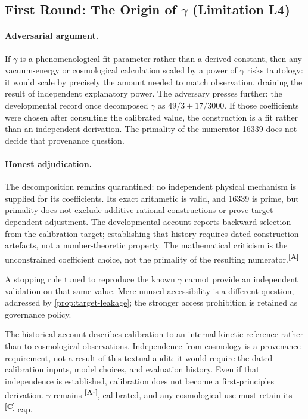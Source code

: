 \documentclass[12pt,a4paper,twoside]{article}
\theoremstyle{plain}
\theoremstyle{definition}
\theoremstyle{remark}
\newcommand{\catmark}[1]{\textsuperscript{\textsf{\textbf{[#1]}}}}
\begin{document}
\subsection{First Round: The Origin of \texorpdfstring{$\gamma$}{gamma} (Limitation L4)}
\label{subsec:adversary-gamma}

\paragraph{Adversarial argument.}
If $\gamma$ is a phenomenological fit parameter rather than a derived
constant, then any vacuum-energy or cosmological calculation scaled by a
power of $\gamma$ risks tautology: it would scale by precisely the amount
needed to match observation, draining the result of independent
explanatory power. The adversary presses further: the developmental
record once decomposed $\gamma$ as $49/3+17/3000$. If those coefficients
were chosen after consulting the calibrated value, the construction is a
fit rather than an independent derivation. The primality of the numerator
16339 does not decide that provenance question.

\paragraph{Honest adjudication.}
The decomposition remains quarantined: no independent physical mechanism
is supplied for its coefficients. Its exact arithmetic is valid, and 16339
is prime, but primality does not exclude additive rational constructions
or prove target-dependent adjustment. The developmental account reports
backward selection from the calibration target; establishing that history
requires dated construction artefacts, not a number-theoretic property.
The mathematical criticism is the unconstrained coefficient choice, not
the primality of the resulting numerator.\catmark{A}

A stopping rule tuned to reproduce the known $\gamma$ cannot provide an
independent validation on that same value. Mere unused accessibility is a
different question, addressed by \cref{prop:target-leakage}; the stronger
access prohibition is retained as governance policy.

The historical account describes calibration to an internal kinetic
reference rather than to cosmological observations. Independence from
cosmology is a provenance requirement, not a result of this textual audit:
it would require the dated calibration inputs, model choices, and evaluation
history. Even if that independence is established, calibration does not
become a first-principles derivation. $\gamma$ remains \catmark{A-},
calibrated, and any cosmological use must retain its \catmark{C} cap.
\end{document}
